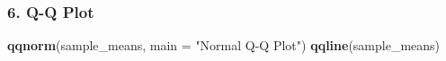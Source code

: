 \documentclass[]{article}
\newenvironment{Shaded}{\begin{snugshade}}{\end{snugshade}}
\newcommand{\KeywordTok}[1]{\textcolor[rgb]{0.13,0.29,0.53}{\textbf{#1}}}
\newcommand{\DataTypeTok}[1]{\textcolor[rgb]{0.13,0.29,0.53}{#1}}
\newcommand{\StringTok}[1]{\textcolor[rgb]{0.31,0.60,0.02}{#1}}
\newcommand{\NormalTok}[1]{#1}
\begin{document}
\subsubsection{6. Q-Q Plot}\label{q-q-plot}

\begin{Shaded}
\begin{Highlighting}[]
\KeywordTok{qqnorm}\NormalTok{(sample_means, }\DataTypeTok{main =} \StringTok{"Normal Q-Q Plot"}\NormalTok{)}
\KeywordTok{qqline}\NormalTok{(sample_means)}
\end{Highlighting}
\end{Shaded}
\end{document}
